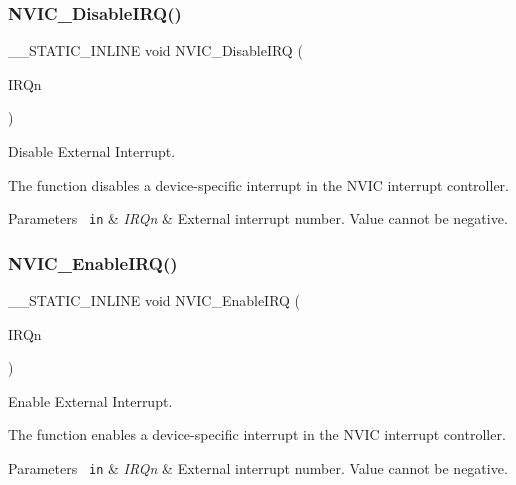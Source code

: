 \subsubsection{\texorpdfstring{NVIC\_DisableIRQ()}{NVIC\_DisableIRQ()}}
{\footnotesize\ttfamily \+\_\+\+\_\+\+S\+T\+A\+T\+I\+C\+\_\+\+I\+N\+L\+I\+NE void N\+V\+I\+C\+\_\+\+Disable\+I\+RQ (\begin{DoxyParamCaption}\item[{\mbox{\hyperlink{group___s_a_m_d21_e15_a__cmsis_gac3af4a32370fb28c4ade8bf2add80251}{I\+R\+Qn\+\_\+\+Type}}}]{I\+R\+Qn }\end{DoxyParamCaption})}



Disable External Interrupt. 

The function disables a device-\/specific interrupt in the N\+V\+IC interrupt controller.


\begin{DoxyParams}[1]{Parameters}
\mbox{\texttt{ in}}  & {\em I\+R\+Qn} & External interrupt number. Value cannot be negative. \\
\hline
\end{DoxyParams}
\mbox{\label{group___c_m_s_i_s___core___n_v_i_c_functions_ga3349f2e3580d7ce22d6530b7294e5921}} 
\subsubsection{\texorpdfstring{NVIC\_EnableIRQ()}{NVIC\_EnableIRQ()}}
{\footnotesize\ttfamily \+\_\+\+\_\+\+S\+T\+A\+T\+I\+C\+\_\+\+I\+N\+L\+I\+NE void N\+V\+I\+C\+\_\+\+Enable\+I\+RQ (\begin{DoxyParamCaption}\item[{\mbox{\hyperlink{group___s_a_m_d21_e15_a__cmsis_gac3af4a32370fb28c4ade8bf2add80251}{I\+R\+Qn\+\_\+\+Type}}}]{I\+R\+Qn }\end{DoxyParamCaption})}



Enable External Interrupt. 

The function enables a device-\/specific interrupt in the N\+V\+IC interrupt controller.


\begin{DoxyParams}[1]{Parameters}
\mbox{\texttt{ in}}  & {\em I\+R\+Qn} & External interrupt number. Value cannot be negative. \\
\hline
\end{DoxyParams}
\mbox{\label{group___c_m_s_i_s___core___n_v_i_c_functions_gafec8042db64c0f8ed432b6c8386a05d8}} 
